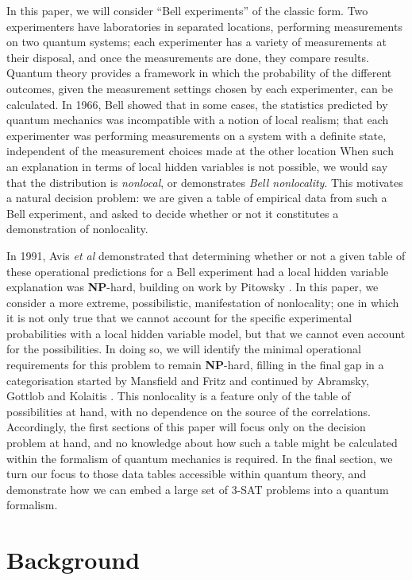 \documentclass[reprint]{revtex4-1}
\theoremstyle{definition}
\begin{document}
In this paper, we will consider ``Bell experiments'' of the classic form. Two experimenters have laboratories in separated locations, performing measurements on two quantum systems; each experimenter has a variety of measurements at their disposal, and once the measurements are done, they compare results. Quantum theory provides a framework in which the probability of the different outcomes, given the measurement settings chosen by each experimenter, can be calculated. In 1966, Bell showed that in some cases, the statistics predicted by quantum mechanics was incompatible with a notion of local realism; that each experimenter was performing measurements on a system with a definite state, independent of the measurement choices made at the other location \cite{Bell1966} When such an explanation in terms of local hidden variables is not possible, we would say that the distribution is \emph{nonlocal}, or demonstrates \emph{Bell nonlocality}. This motivates a natural decision problem: we are given a table of empirical data from such a Bell experiment, and asked to decide whether or not it constitutes a demonstration of nonlocality. 

In 1991, Avis \emph{et al} \cite{Avis2004} demonstrated that determining whether or not a given table of these operational predictions for a Bell experiment had a local hidden variable explanation was \textbf{NP}-hard, building on work by Pitowsky \cite{Pito1991}. In this paper, we consider a more extreme, possibilistic, manifestation of nonlocality; one in which it is not only true that we cannot account for the specific experimental probabilities with a local hidden variable model, but that we cannot even account for the possibilities. In doing so, we will identify the minimal operational requirements for this problem to remain \textbf{NP}-hard, filling in the final gap in a categorisation started by Mansfield and Fritz \cite{Mans2011,Mans2017} and continued by Abramsky, Gottlob and Kolaitis \cite{Abra2013}. This nonlocality is a feature only of the table of possibilities at hand, with no dependence on the source of the correlations. Accordingly, the first sections of this paper will focus only on the decision problem at hand, and no knowledge about how such a table might be calculated within the formalism of quantum mechanics is required. In the final section, we turn our focus to those data tables accessible within quantum theory, and demonstrate how we can embed a large set of \textsc{3-SAT} problems into a quantum formalism.


\section{Background}
\end{document}
